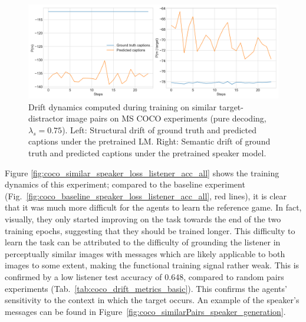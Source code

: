 \begin{figure}[h]
	\centering
	\includegraphics[width=\linewidth]{images/coco_structural_semantic_drift_4000_pure_075_similarFixed.png}
	\caption{Drift dynamics computed during training on similar target-distractor image pairs on MS COCO experiments (pure decoding, $\lambda_s=0.75$). Left: Structural drift of ground truth and predicted captions under the pretrained LM. Right: Semantic drift of ground truth and predicted captions under the pretrained speaker model.}
	\label{fig:coco_similar_str_sem_drift_all}
\end{figure}

Figure \ref{fig:coco_similar_speaker_loss_listener_acc_all} shows the training dynamics of this experiment; compared to the baseline experiment (Fig.~\ref{fig:coco_baseline_speaker_loss_listener_acc_all}, red lines), it is clear that it was much more difficult for the agents to learn the reference game. In fact, visually, they only started improving on the task towards the end of the two training epochs, suggesting that they should be trained longer. This difficulty to learn the task can be attributed to the difficulty of grounding the listener in perceptually similar images with messages which are likely applicable to both images to some extent, making the functional training signal rather weak. This is confirmed by a low listener test accuracy of 0.648, compared to random pairs experiments (Tab.~\ref{tab:coco_drift_metrics_basic}). This confirms the agents' sensitivity to the context in which the target occurs. An example of the speaker's messages can be found in Figure~\ref{fig:coco_similarPairs_speaker_generation}.

